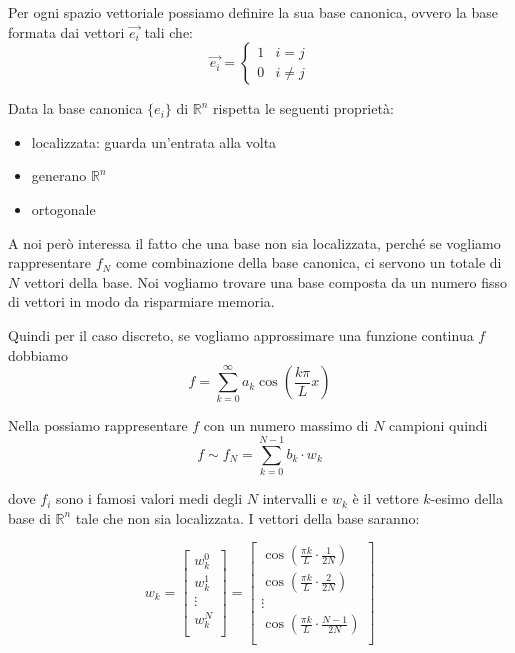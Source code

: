 \begin{nota}
    Per ogni spazio vettoriale possiamo definire la sua base canonica, ovvero
    la base formata dai vettori $\vec{e_i}$ tali che:
    \begin{equation}
        \vec{e_i} = \begin{cases}
            1 & i = j \\
            0 & i \ne j
        \end{cases}
    \end{equation}
\end{nota}

\begin{nota}
    Data la base canonica $\{e_i\}$ di $\mathbb{R}^n$ rispetta le seguenti proprietà:
    \begin{itemize}
        \item localizzata: guarda un'entrata alla volta
        \item generano $\mathbb{R}^n$
        \item ortogonale
    \end{itemize}
\end{nota}

A noi però interessa il fatto che una base non sia localizzata, perché se vogliamo 
rappresentare $f_N$ come combinazione della base canonica, ci servono un totale di 
$N$ vettori della base. Noi vogliamo trovare una base composta da un numero 
fisso di vettori in modo da risparmiare memoria. 

Quindi per il caso discreto, se vogliamo approssimare una funzione continua 
$f$ dobbiamo 
$$f= \sum_{k = 0}^{\infty} a_k\cos (\frac{k\pi}{L}x)$$

Nella possiamo rappresentare $f$ con un numero massimo di $N$ campioni quindi 
$$f \sim f_N = \sum_{k=0}^{N-1} b_k \cdot w_k$$

dove $f_i$ sono i famosi valori medi degli $N$ intervalli e $w_k$ è il vettore 
$k$-esimo della base di $\mathbb{R}^n$ tale che non sia localizzata. I vettori 
della base saranno:

$$w_k =\left[\begin{array}{c}
    w_k^0\\
    w_k^1\\
    \vdots\\
    w_k^N\\
\end{array}\right] = \left[\begin{array}{c}
    \cos (\frac{\pi k}{L}\cdot \frac{1}{2N})\\
    \cos (\frac{\pi k}{L}\cdot \frac{2}{2N})\\
    \vdots\\
    \cos (\frac{\pi k}{L}\cdot \frac{N-1}{2N})\\
\end{array}\right]$$

